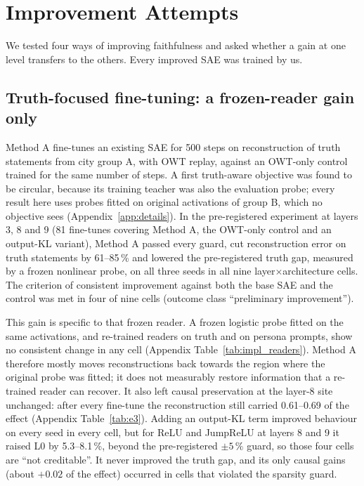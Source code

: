 \section{Improvement Attempts}\label{sec:improve}

We tested four ways of improving faithfulness and asked whether a gain at one level transfers to the others. Every
improved SAE was trained by us.

\subsection{Truth-focused fine-tuning: a frozen-reader gain only}\label{sec:finetune}

Method A fine-tunes an existing SAE for 500 steps on reconstruction of truth statements from city group A, with OWT
replay, against an OWT-only control trained for the same number of steps. A first truth-aware objective was found to be
circular, because its training teacher was also the evaluation probe; every result here uses probes fitted on original
activations of group B, which no objective sees (Appendix~\ref{app:details}). In the pre-registered experiment at layers
3, 8 and 9 (81 fine-tunes covering Method A, the OWT-only control and an output-KL variant), Method A passed every
guard, cut reconstruction error on truth statements by 61--85\,\% and lowered the pre-registered truth gap, measured by a frozen nonlinear probe, on all three seeds in all nine
layer$\times$architecture cells. The criterion of consistent improvement against both the base SAE and the control was
met in four of nine cells (outcome class ``preliminary improvement'').

This gain is specific to that frozen reader. A frozen logistic probe fitted on the same activations, and re-trained
readers on truth and on persona prompts, show no consistent change in any cell (Appendix Table~\ref{tab:impl_readers}).
Method A therefore mostly moves reconstructions back towards the region where the original probe was fitted; it does
not measurably restore information that a re-trained reader can recover. It also left causal preservation at the
layer-8 site unchanged: after every fine-tune the reconstruction still carried 0.61--0.69 of the effect (Appendix
Table~\ref{tab:e3}). Adding an output-KL term improved behaviour on every seed in every cell, but for ReLU and JumpReLU
at layers 8 and 9 it raised L0 by 5.3--8.1\,\%, beyond the pre-registered $\pm5\,\%$ guard, so those four cells are
``not creditable''. It never improved the truth gap, and its only causal gains (about $+0.02$ of the effect)
occurred in cells that violated the sparsity guard.

